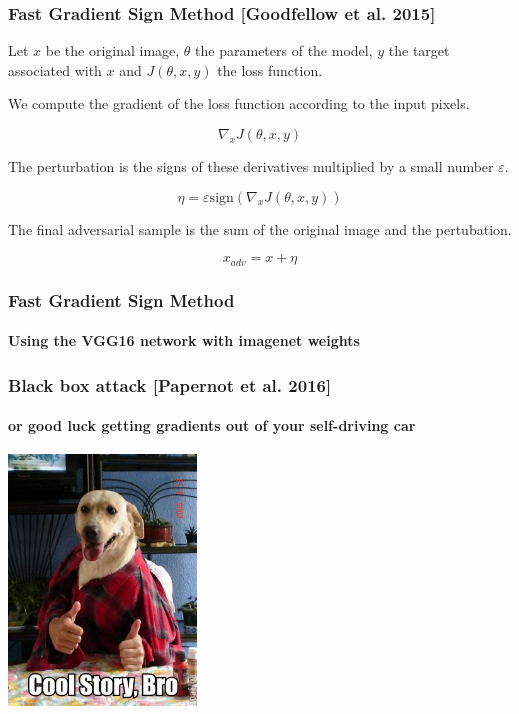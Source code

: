 \documentclass[9pt]{beamer}
\begin{document}
\begin{frame}
  \frametitle{Fast Gradient Sign Method [Goodfellow et al. 2015]}

  Let $x$ be the original image, $\theta$ the parameters of the model,
  $y$ the target associated with $x$ and $J(\theta, x, y)$ the loss
  function.

  \bigskip

  We compute the gradient of the loss function according to the input
  pixels.

  \[
  \nabla_{x} J(\theta, x, y)
  \]

  \bigskip

  The perturbation is the signs of these derivatives multiplied by a
  small number $\varepsilon$.

  \[
  \eta = \varepsilon \text{sign}(\nabla_{x} J(\theta, x, y))
  \]

  \bigskip

  The final adversarial sample is the sum of the original image and
  the pertubation.

  \[
  x_{adv} = x + \eta
  \]

\end{frame}

\begin{frame}
  \frametitle{Fast Gradient Sign Method}

  \framesubtitle{Using the \textbf{VGG16} network with imagenet
    weights}

  \begin{center}
    
  \end{center}
\end{frame}

\begin{frame}
  \frametitle{Black box attack [Papernot et al. 2016]}

  \framesubtitle{or good luck getting gradients out of your
    self-driving car}

  \begin{center}
    \includegraphics[width = 5cm]{images/cool_story_bro.jpg}
  \end{center}

\end{frame}
\end{document}
